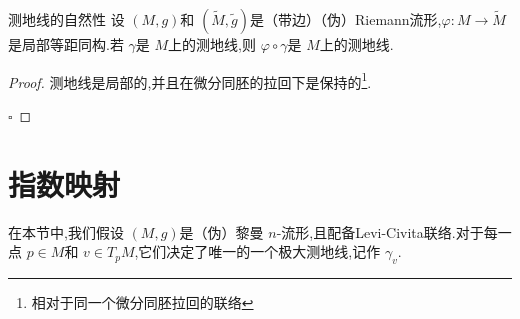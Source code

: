 \documentclass[../../几何与拓扑.tex]{subfiles}
\begin{document}
\begin{corollary}{测地线的自然性}
    设 \(  \left( M,g \right)   \)和 \(  \left( \tilde{M},\tilde{g}  \right)   \)是（带边）（伪）Riemann流形,\(   \varphi : M\to \tilde{M}  \)是局部等距同构.若 \(   \gamma   \)是 \(  M  \)上的测地线,则 \(   \varphi \circ  \gamma   \)是 \(  M  \)上的测地线.       
\end{corollary}

\begin{proof}
    测地线是局部的,并且在微分同胚的拉回下是保持的\footnote{相对于同一个微分同胚拉回的联络}.

    \hfill $\square$
\end{proof}

\section{指数映射}
在本节中,我们假设 \(  \left( M,g \right)   \)是（伪）黎曼 \(  n  \)-流形,且配备Levi-Civita联络.对于每一点 \(  p \in M  \)和 \(  v \in T_{p}M  \),它们决定了唯一的一个极大测地线,记作 \(   \gamma _{v}  \).       
\end{document}
